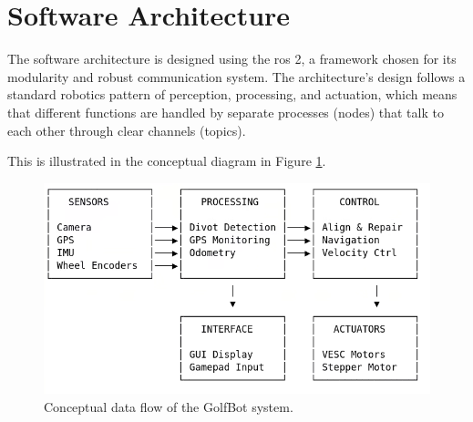 

\section{Software Architecture}
\label{sec:software_architecture}
The software architecture is designed using the \gls{ros} 2, a framework chosen for its modularity and robust communication system. The architecture's design follows a standard robotics pattern of perception, processing, and actuation, which means that different functions are handled by separate processes (nodes) that talk to each other through clear channels (topics). 

This is illustrated in the conceptual diagram in Figure \ref{fig:conceptual_flow}.

\begin{figure}[h!]
    \centering
    \includegraphics[width=1\linewidth]{figures/data_flow_diagram.png}
    \caption{Conceptual data flow of the GolfBot system.}
    \label{fig:conceptual_flow}
\end{figure}

